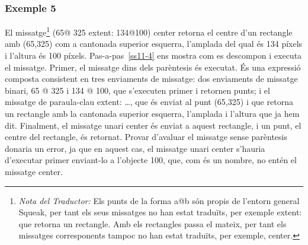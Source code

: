 \subsubsection*{Exemple 5}
El missatge\footnote{\emph{Nota del Traductor:} Els punts de la forma \textsf{a@b} són propis de l'entorn general Squeak, per tant els seus missatges no han estat traduïts, per exemple \textsf{extent:} que retorna un rectangle. Amb els rectangles passa el mateix, per tant els missatges corresponents tampoc no han estat traduïts, per exemple, \textsf{center}.} \textsf{(65@ 325 extent: 134@100) center} retorna el centre d'un rectangle amb \textsf{(65,325)} com a cantonada superior esquerra, l'amplada del qual és 134 píxels i l'altura és 100 píxels. 
Pas-a-pas~\ref{ss11-4} ens mostra com es descompon i executa el missatge. Primer, el missatge dins dels parèntesis és executat. És una expressió composta consistent en tres enviaments de missatge: dos enviaments de missatge binari, \textsf{65 @ 325} i \textsf{134 @ 100}, que s'executen primer i retornen punts; i el missatge de paraula-clau \textsf{extent: \dots}, que és enviat al punt \textsf{(65,325)} i que retorna un rectangle amb la cantonada superior esquerra, l'amplada i l'altura que ja hem dit. Finalment, el missatge unari \textsf{center} és enviat a aquest rectangle, i un punt, el centre del rectangle, és retornat. Provar d'avaluar el missatge sense parèntesis donaria un error, ja que en aquest cas, el missatge unari \textsf{center} s'hauria d'executar primer enviant-lo a l'objecte \textsf{100}, que, com és un nombre, no entén el missatge \textsf{center}.

